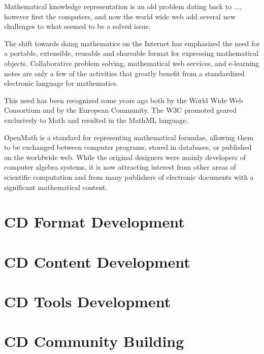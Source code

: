 \documentclass{euproposal}
\begin{document}
Mathematical knowledge representation is an old problem dating back to
..., however first the computers, and now the world wide web add
several new challenges to what seemed to be a solved issue.

The shift towards doing mathematics on the Internet has emphasized the
need for a portable, extensible, reusable and shareable format for
expressing mathematical objects. Collaborative problem solving,
mathematical web services, and e-learning notes are only a few of the
activities that greatly benefit from a standardized electronic
language for mathematics.

This need has been recognized some years ago both by the World Wide
Web Consortium and by the European Community. The W3C promoted  geared exclusively to Math and resulted in the MathML
language.

OpenMath is a standard for representing mathematical formulae,
allowing them to be exchanged between computer programs, stored in
databases, or published on the worldwide web.  While the original
designers were mainly developers of computer algebra systems, it is
now attracting interest from other areas of scientific computation and
from many publishers of electronic documents with a significant
mathematical content. 









\section{CD Format Development}
\section{CD Content Development}
\section{CD Tools  Development}
\section{CD Community Building}
\end{document}
